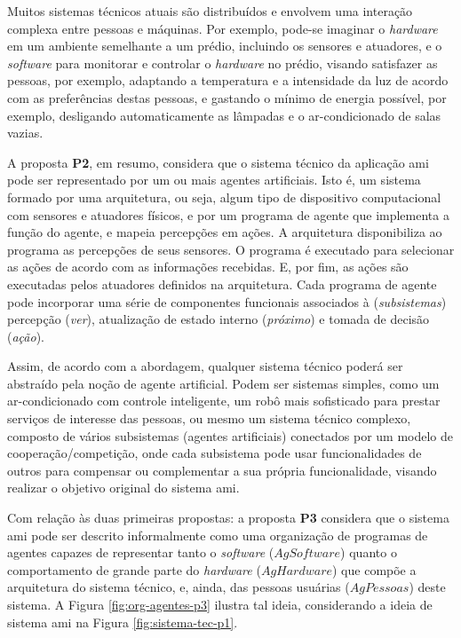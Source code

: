     Muitos sistemas técnicos atuais são distribuídos e envolvem uma interação complexa entre pessoas e máquinas. Por exemplo, pode-se imaginar o \textit{hardware} em um ambiente semelhante a um prédio, incluindo os sensores e atuadores, e o \textit{software} para monitorar e controlar o \textit{hardware} no prédio, visando satisfazer as pessoas, por exemplo, adaptando a temperatura e a intensidade da luz de acordo com as preferências destas pessoas, e gastando o mínimo de energia possível, por exemplo, desligando automaticamente as lâmpadas e o ar-condicionado de salas vazias.
    
    A proposta \textbf{P2}, em resumo, considera que o sistema técnico da aplicação \acrshort{ami} pode ser representado por um ou mais agentes artificiais. Isto é, um sistema formado por uma arquitetura, ou seja, algum tipo de dispositivo computacional com sensores e atuadores físicos, e por um programa de agente que implementa a função do agente, e mapeia percepções em ações. A arquitetura disponibiliza ao programa as percepções de seus sensores. O programa é executado para selecionar as ações de acordo com as informações recebidas. E, por fim, as ações são executadas pelos atuadores definidos na arquitetura. Cada programa de agente pode incorporar uma série de componentes funcionais associados à (\emph{subsistemas}) percepção (\emph{ver}), atualização de estado interno (\emph{próximo}) e tomada de decisão (\emph{ação}).
    
    Assim, de acordo com a abordagem, qualquer sistema técnico poderá ser abstraído pela noção de agente artificial. Podem ser sistemas simples, como um ar-condicionado com controle inteligente, um robô mais sofisticado para prestar serviços de interesse das pessoas, ou mesmo um sistema técnico complexo, composto de vários subsistemas (agentes artificiais) conectados por um modelo de cooperação/competição, onde cada subsistema pode usar funcionalidades de outros para compensar ou complementar a sua própria funcionalidade, visando realizar o objetivo original do sistema \acrshort{ami}.
    
    Com relação às duas primeiras propostas: a proposta \textbf{P3} considera que o sistema \acrshort{ami} pode ser descrito informalmente como uma organização de programas de agentes capazes de representar tanto o \textit{software} ($AgSoftware$) quanto o comportamento de grande parte do \textit{hardware} ($AgHardware$) que compõe a arquitetura do sistema técnico, e, ainda, das pessoas usuárias ($AgPessoas$) deste sistema. A Figura \ref{fig:org-agentes-p3} ilustra tal ideia, considerando a ideia de sistema \acrshort{ami} na Figura \ref{fig:sistema-tec-p1}.
    
